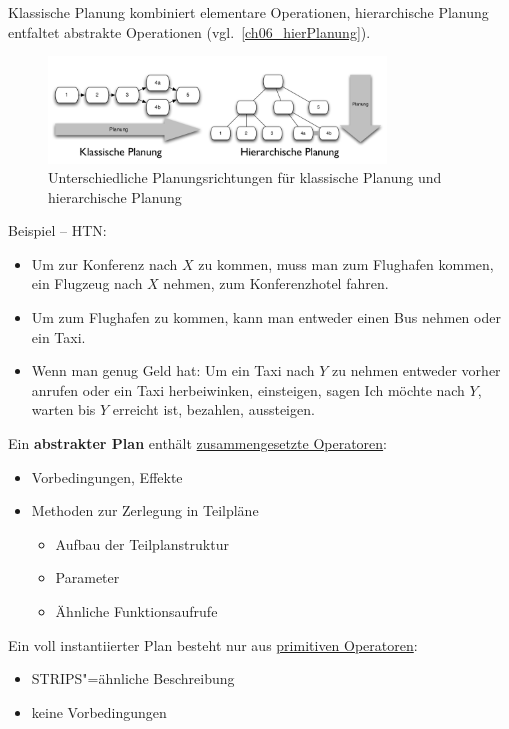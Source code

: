 Klassische Planung kombiniert elementare Operationen, hierarchische Planung \glqq entfaltet\grqq{} abstrakte Operationen (vgl.\ \autoref{ch06_hierPlanung}).
\begin{figure}[ht]
	\centering 
	\includegraphics[width=0.8\textwidth]{figures/ch06_hierarchischePlanung.png}
	\caption{Unterschiedliche Planungsrichtungen für klassische Planung und hierarchische Planung}
	\label{ch06_hierPlanung}
\end{figure}
Beispiel -- HTN:
\begin{itemize}
\item Um zur Konferenz nach $X$ zu kommen, muss man zum Flughafen kommen, ein Flugzeug nach $X$ nehmen, zum Konferenzhotel fahren.
\item Um zum Flughafen zu kommen, kann man entweder einen Bus nehmen oder ein Taxi.
\item Wenn man genug Geld hat: Um ein Taxi nach $Y$ zu nehmen entweder vorher anrufen oder ein Taxi herbeiwinken, einsteigen, sagen \glqq Ich möchte nach $Y$\grqq, warten bis $Y$ erreicht ist, bezahlen, aussteigen.
\end{itemize}
Ein \textbf{abstrakter Plan} enthält \underline{zusammengesetzte Operatoren}:
\begin{itemize}
	\item Vorbedingungen, Effekte
	\item Methoden zur Zerlegung in Teilpläne
	\begin{itemize}
		\item Aufbau der Teilplanstruktur
		\item Parameter
		\item Ähnliche Funktionsaufrufe
	\end{itemize}
\end{itemize}
Ein voll instantiierter Plan besteht nur aus \underline{primitiven Operatoren}:
\begin{itemize}
	\item STRIPS"=ähnliche Beschreibung
	\item keine Vorbedingungen
\end{itemize}

